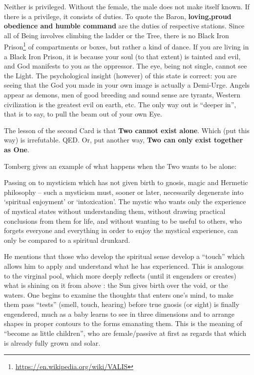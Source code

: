 Neither is privileged. Without the female, the male does not make itself known. If there is a privilege, it consists of duties. To quote the Baron, \textbf{loving,proud obedience and humble command} are the duties of respective stations. Since all of Being involves climbing the ladder or the Tree, there is no Black Iron Prison\footnote{\url{https://en.wikipedia.org/wiki/VALIS}} of compartments or boxes, but rather a kind of dance. If you are living in a Black Iron Prison, it is because your soul (to that extent) is tainted and evil, and God manifests to you as the oppressor. The eye, being not single, cannot see the Light. The psychological insight (however) of this state is correct: you are seeing that the God you made in your own image is actually a Demi-Urge. Angels appear as demons, men of good breeding and sound sense are tyrants, Western civilization is the greatest evil on earth, etc. The only way out is ``deeper in'', that is to say, to pull the beam out of your own Eye.

The lesson of the second Card is that \textbf{Two cannot exist alone}. Which (put this way) is irrefutable. QED. Or, put another way, \textbf{Two can only exist together as One}.

Tomberg gives an example of what happens when the Two wants to be alone:

\begin{quotex}
Passing on to mysticism which has not given birth to gnosis, magic and Hermetic philosophy -- such a mysticism must, sooner or later, necessarily degenerate into `spiritual enjoyment' or `intoxication'. The mystic who wants only the experience of mystical states without understanding them, without drawing practical conclusions from them for life, and without wanting to be useful to others, who forgets everyone and everything in order to enjoy the mystical experience, can only be compared to a spiritual drunkard.
\end{quotex}


He mentions that those who develop the spiritual sense develop a ``touch'' which allows him to apply and understand what he has experienced. This is analogous to the virginal pool, which more deeply reflects (until it engenders or creates) what is shining on it from above : the Sun gives birth over the void, or the waters. One begins to examine the thoughts that enters one's mind, to make them pass ``tests'' (smell, touch, hearing) before true gnosis (or sight) is finally engendered, much as a baby learns to see in three dimensions and to arrange shapes in proper contours to the forms emanating them. This is the meaning of ``become as little children'', who are female/passive at first as regards that which is already fully grown and solar.

